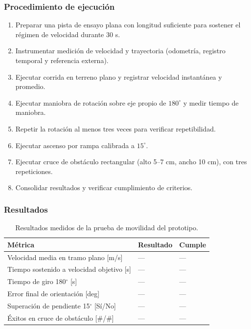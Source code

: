 \subsubsection{Procedimiento de ejecución}

\begin{enumerate}
    \item Preparar una pista de ensayo plana con longitud suficiente para sostener el régimen de velocidad durante 30 s.
    \item Instrumentar medición de velocidad y trayectoria (odometría, registro temporal y referencia externa).
    \item Ejecutar corrida en terreno plano y registrar velocidad instantánea y promedio.
    \item Ejecutar maniobra de rotación sobre eje propio de $180^\circ$ y medir tiempo de maniobra.
    \item Repetir la rotación al menos tres veces para verificar repetibilidad.
    \item Ejecutar ascenso por rampa calibrada a $15^\circ$.
    \item Ejecutar cruce de obstáculo rectangular (alto 5--7 cm, ancho 10 cm), con tres repeticiones.
    \item Consolidar resultados y verificar cumplimiento de criterios.
\end{enumerate}

\subsubsection{Resultados}

\begin{table}[H]
\centering
\small
\begin{tabular}{p{8.8cm} p{2.2cm} p{2.8cm}}
\toprule
\textbf{Métrica} & \textbf{Resultado} & \textbf{Cumple} \\
\midrule
Velocidad media en tramo plano [m/s] & --- & --- \\
Tiempo sostenido a velocidad objetivo [s] & --- & --- \\
Tiempo de giro 180$^\circ$ [s] & --- & --- \\
Error final de orientación [deg] & --- & --- \\
Superación de pendiente 15$^\circ$ [Sí/No] & --- & --- \\
Éxitos en cruce de obstáculo [\#/\#] & --- & --- \\
\bottomrule
\end{tabular}
\caption{Resultados medidos de la prueba de movilidad del prototipo.}
\label{tab:resultados_prueba_movilidad}
\end{table}
